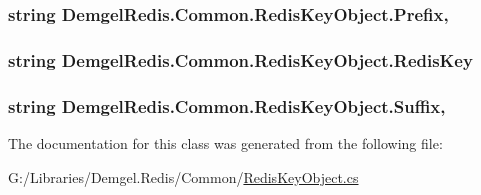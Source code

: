 \subsubsection[{Prefix}]{\setlength{\rightskip}{0pt plus 5cm}string Demgel\+Redis.\+Common.\+Redis\+Key\+Object.\+Prefix\hspace{0.3cm}{\ttfamily [get]}, {\ttfamily [set]}}\label{class_demgel_redis_1_1_common_1_1_redis_key_object_a34d0b8ed1d122aebbe305326ae74d9d1}
\hypertarget{class_demgel_redis_1_1_common_1_1_redis_key_object_ad94d27558ce57f123e6441745b0238ff}{}
\subsubsection[{Redis\+Key}]{\setlength{\rightskip}{0pt plus 5cm}string Demgel\+Redis.\+Common.\+Redis\+Key\+Object.\+Redis\+Key\hspace{0.3cm}{\ttfamily [get]}}\label{class_demgel_redis_1_1_common_1_1_redis_key_object_ad94d27558ce57f123e6441745b0238ff}
\hypertarget{class_demgel_redis_1_1_common_1_1_redis_key_object_ac220e601714b3b2c192790f759c54dbc}{}
\subsubsection[{Suffix}]{\setlength{\rightskip}{0pt plus 5cm}string Demgel\+Redis.\+Common.\+Redis\+Key\+Object.\+Suffix\hspace{0.3cm}{\ttfamily [get]}, {\ttfamily [set]}}\label{class_demgel_redis_1_1_common_1_1_redis_key_object_ac220e601714b3b2c192790f759c54dbc}


The documentation for this class was generated from the following file\+:\begin{DoxyCompactItemize}
\item 
G\+:/\+Libraries/\+Demgel.\+Redis/\+Common/\hyperlink{_redis_key_object_8cs}{Redis\+Key\+Object.\+cs}\end{DoxyCompactItemize}
